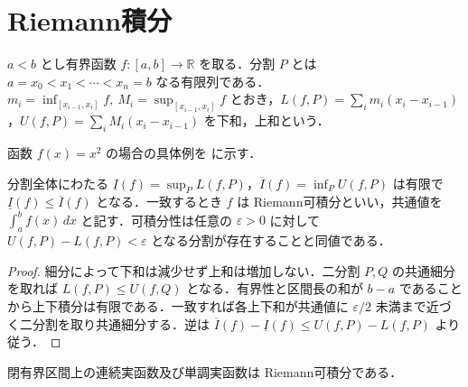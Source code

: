 \section{Riemann積分}
\begin{defn}[分割とDarboux上下和]
$a<b$ とし有界函数 $f:[a,b]\to\mathbb R$ を取る．分割 $P$ とは $a=x_0<x_1<\cdots<x_n=b$ なる有限列である．$m_i=\inf_{[x_{i-1},x_i]} f,\ M_i=\sup_{[x_{i-1},x_i]} f$ とおき，$L(f,P)=\sum_i m_i(x_i-x_{i-1})$，$U(f,P)=\sum_iM_i(x_i-x_{i-1})$ を下和，上和という．
\end{defn}
函数 $f(x)=x^2$ の場合の具体例を  に示す．
\begin{prop}[上下積分と可積分性の判定]
分割全体にわたる $\underline I(f)=\sup_P L(f,P)$，$\overline I(f)=\inf_P U(f,P)$ は有限で $\underline I(f)\leq\overline I(f)$ となる．一致するとき $f$ は Riemann可積分といい，共通値を $\int_a^b f(x)\,dx$ と記す．可積分性は任意の $\varepsilon>0$ に対して $U(f,P)-L(f,P)<\varepsilon$ となる分割が存在することと同値である．
\end{prop}
\begin{proof}
細分によって下和は減少せず上和は増加しない．二分割 $P,Q$ の共通細分を取れば $L(f,P)\leq U(f,Q)$ となる．有界性と区間長の和が $b-a$ であることから上下積分は有限である．一致すれば各上下和が共通値に $\varepsilon/2$ 未満まで近づく二分割を取り共通細分する．逆は $\overline I(f)-\underline I(f)\leq U(f,P)-L(f,P)$ より従う．
\end{proof}
\begin{prop}[連続函数と単調函数の可積分性]
閉有界区間上の連続実函数及び単調実函数は Riemann可積分である．
\end{prop}
